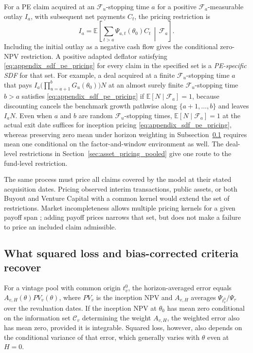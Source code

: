 For a PE claim acquired at an $\mathcal F_u$-stopping time $a$ for a positive $\mathcal F_a$-measurable outlay $I_a$, with subsequent net payments $C_t$, the pricing restriction is
\begin{equation}
\tag{\thesection.1}
\label{eq:appendix_sdf_pe_pricing}
 I_a=\mathbb E\!\left[\sum_{t>a}\Psi_{a,t}(\theta_0)C_t
                   \,\middle|\,\mathcal F_a\right].
\end{equation}
Including the initial outlay as a negative cash flow gives the conditional zero-NPV restriction. A positive adapted deflator satisfying \eqref{eq:appendix_sdf_pe_pricing} for every claim in the specified set is a \emph{PE-specific SDF} for that set. For example, a deal acquired at a finite $\mathcal F_u$-stopping time $a$ that pays $I_a\bigl(\prod_{u=a+1}^b G_u(\theta_0)\bigr)N$ at an almost surely finite $\mathcal F_u$-stopping time $b>a$ satisfies \eqref{eq:appendix_sdf_pe_pricing} if $\mathbb E[N\mid\mathcal F_a]=1$, because discounting cancels the benchmark growth pathwise along $\{a+1,\dots,b\}$ and leaves $I_aN$. Even when $a$ and $b$ are random $\mathcal F_u$-stopping times, $\mathbb E[N\mid\mathcal F_a]=1$ at the actual exit date suffices for inception pricing \eqref{eq:appendix_sdf_pe_pricing}, whereas preserving zero mean under horizon weighting in Subsection~\ref{sec:appendix_sdf_squared_loss} requires mean one conditional on the factor-and-window environment as well. The deal-level restrictions in Section~\ref{sec:asset_pricing_pooled} give one route to the fund-level restriction.

The same process must price all claims covered by the model at their stated acquisition dates. Pricing observed interim transactions, public assets, or both Buyout and Venture Capital with a common kernel would extend the set of restrictions. Market incompleteness allows multiple pricing kernels for a given payoff span \citep{HR87}; adding payoff prices narrows that set, but does not make a failure to price an included claim admissible.

\subsection{What squared loss and bias-corrected criteria recover}
\label{sec:appendix_sdf_squared_loss}

For a vintage pool with common origin $t_v^0$, the horizon-averaged error equals $A_{v,H}(\theta)PV_v(\theta)$, where $PV_v$ is the inception NPV and $A_{v,H}$ averages $\Psi_{t_v^0}/\Psi_\tau$ over the revaluation dates. If the inception NPV at $\theta_0$ has mean zero conditional on the information set $\mathcal C_v$ determining the weight $A_{v,H}$, the weighted error also has mean zero, provided it is integrable. Squared loss, however, also depends on the conditional variance of that error, which generally varies with $\theta$ even at $H=0$.

